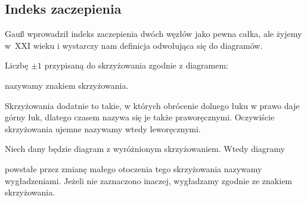 
\subsection{Indeks zaczepienia}
Gauß wprowadził indeks zaczepienia dwóch węzłów jako pewna całka, ale żyjemy w~XXI wieku i wystarczy nam definicja odwołująca się do diagramów.

\begin{definition}[znak]
%
    Liczbę $\pm 1$ przypisaną do skrzyżowania zgodnie z diagramem:
\begin{comment}
    \[
        \sign \left( \MediumPlusCrossingArrows \right) = +1 \quad
        \sign \left( \MediumMinusCrossingArrows \right) = -1
    \]
\end{comment}
    nazywamy znakiem skrzyżowania.
\end{definition}

Skrzyżowania dodatnie to takie, w których obrócenie dolnego łuku w prawo daje górny łuk, dlatego czasem nazywa się je także praworęcznymi.
Oczywiście skrzyżowania ujemne nazywamy wtedy leworęcznymi.
%
%

\begin{definition}[wygładzenie]
%
    Niech dany będzie diagram z wyróżnionym skrzyżowaniem.
    Wtedy diagramy
\begin{comment}
    \begin{figure}[H]
        \begin{minipage}[b]{.48\linewidth}
            \[
                \LargeAlphaSmoothing
            \]
            \subcaption{wygładzenie dodatnie}
        \end{minipage}
        \begin{minipage}[b]{.48\linewidth}
            \[
                \LargeBetaSmoothing
            \]
            \subcaption{wygładzenie ujemne}
        \end{minipage}
    \end{figure}
\end{comment}
    powstałe przez zmianę małego otoczenia tego skrzyżowania nazywamy wygładzeniami.
    Jeżeli nie zaznaczono inaczej, wygładzamy zgodnie ze znakiem skrzyżowania.
\end{definition}

